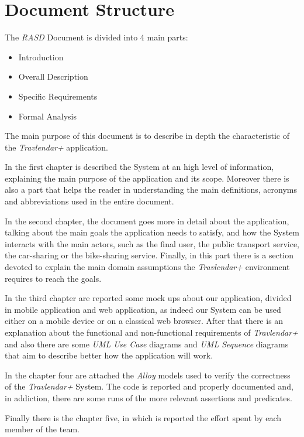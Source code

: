 \section{Document Structure}
The \emph{RASD} Document is divided into 4 main parts:
\begin{itemize}
    \item Introduction
    \item Overall Description
    \item Specific Requirements
    \item Formal Analysis
\end{itemize}
The main purpose of this document is to describe in depth the characteristic of the \emph{Travlendar+} application.

In the first chapter is described the System at an high level of information, explaining the main purpose of the application and its scope. Moreover there is also a part that helps the reader in understanding the main definitions, acronyms and abbreviations used in the entire document.

In the second chapter, the document goes more in detail about the application, talking about the main goals the application needs to satisfy, and how the System interacts with the main actors, such as the final user, the public transport service, the car-sharing or the bike-sharing service. Finally, in this part there is a section devoted to explain the main domain assumptions the \emph{Travlendar+} environment requires to reach the goals.

In the third chapter are reported some mock ups about our application, divided in mobile application and web application, as indeed our System can be used either on a mobile device or on a classical web browser. After that there is an explanation about the functional and non-functional requirements of \emph{Travlendar+} and also there are some \emph{UML Use Case} diagrams and \emph{UML Sequence} diagrams that aim to describe better how the application will work.

In the chapter four are attached the \emph{Alloy} models used to verify the correctness of the \emph{Travlendar+} System. The code is reported and properly documented and, in addiction, there are some runs of the more relevant assertions and predicates. 

Finally there is the chapter five, in which is reported the effort spent by each member of the team.

